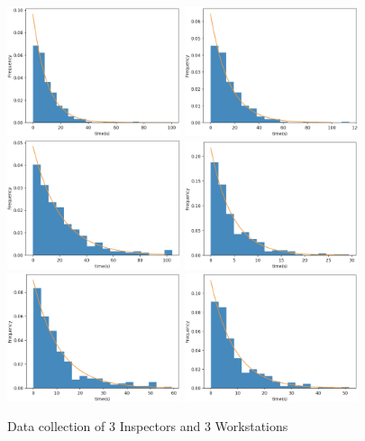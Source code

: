 \documentclass{article}
\begin{document}
\begin{figure}[htbp]
\begin{center}
\includegraphics[width=2in]{dataCollection1.png}
\includegraphics[width=2in]{dataCollection2.png}
\includegraphics[width=2in]{dataCollection3.png}
\includegraphics[width=2in]{dataCollection4.png}
\includegraphics[width=2in]{dataCollection5.png}
\includegraphics[width=2in]{dataCollection6.png}
\caption{Data collection of 3 Inspectors and 3 Workstations}
\label{data}
\end{center}
\end{figure}
\end{document}
